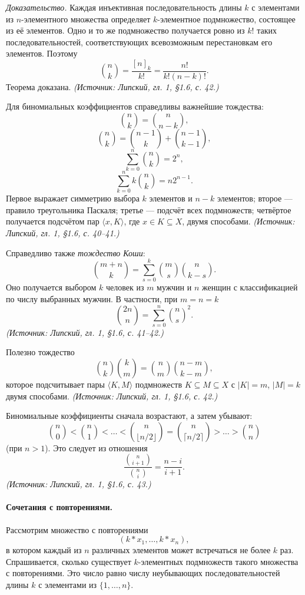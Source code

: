\documentclass[a4paper,12pt]{article}
\begin{document}
\emph{Доказательство.} Каждая инъективная последовательность длины \(k\) с элементами из \(n\)-элементного множества определяет \(k\)-элементное подмножество, состоящее из её элементов. Одно и то же подмножество получается ровно из \(k!\) таких последовательностей, соответствующих всевозможным перестановкам его элементов. Поэтому
\[
\binom{n}{k}=\frac{[n]_k}{k!}=\frac{n!}{k!(n-k)!}.
\]
Теорема доказана.
\textit{(Источник: Липский, гл. 1, §1.6, с. 42.)}

Для биномиальных коэффициентов справедливы важнейшие тождества:
\[
\binom{n}{k}=\binom{n}{n-k},
\]
\[
\binom{n}{k}=\binom{n-1}{k}+\binom{n-1}{k-1},
\]
\[
\sum_{k=0}^n \binom{n}{k}=2^n,
\]
\[
\sum_{k=0}^n k\binom{n}{k}=n2^{n-1}.
\]
Первое выражает симметрию выбора \(k\) элементов и \(n-k\) элементов; второе --- правило треугольника Паскаля; третье --- подсчёт всех подмножеств; четвёртое получается подсчётом пар \(\langle x,K\rangle\), где \(x\in K\subseteq X\), двумя способами.
\textit{(Источник: Липский, гл. 1, §1.6, с. 40--41.)}

Справедливо также \emph{тождество Коши}:
\[
\binom{m+n}{k}=\sum_{s=0}^k \binom{m}{s}\binom{n}{k-s}.
\]
Оно получается выбором \(k\) человек из \(m\) мужчин и \(n\) женщин с классификацией по числу выбранных мужчин. В частности, при \(m=n=k\)
\[
\binom{2n}{n}=\sum_{s=0}^n \binom{n}{s}^2.
\]
\textit{(Источник: Липский, гл. 1, §1.6, с. 41--42.)}

Полезно тождество
\[
\binom{n}{k}\binom{k}{m}=\binom{n}{m}\binom{n-m}{k-m},
\]
которое подсчитывает пары \(\langle K,M\rangle\) подмножеств \(K\subseteq M\subseteq X\) с \(|K|=m\), \(|M|=k\) двумя способами.
\textit{(Источник: Липский, гл. 1, §1.6, с. 42.)}

Биномиальные коэффициенты сначала возрастают, а затем убывают:
\[
\binom{n}{0}<\binom{n}{1}<\dots<\binom{n}{\lfloor n/2\rfloor}
=
\binom{n}{\lceil n/2\rceil}
>\dots>\binom{n}{n}
\]
(при \(n>1\)). Это следует из отношения
\[
\frac{\binom{n}{i+1}}{\binom{n}{i}}=\frac{n-i}{i+1}.
\]
\textit{(Источник: Липский, гл. 1, §1.6, с. 43.)}

\paragraph{Сочетания с повторениями.}
Рассмотрим множество с повторениями
\[
(k*x_1,\dots,k*x_n),
\]
в котором каждый из \(n\) различных элементов может встречаться не более \(k\) раз. Спрашивается, сколько существует \(k\)-элементных подмножеств такого множества с повторениями. Это число равно числу неубывающих последовательностей длины \(k\) с элементами из \(\{1,\dots,n\}\).
\end{document}
